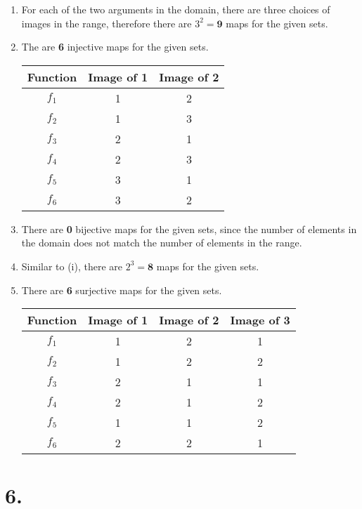 \documentclass[12pt]{article}
\newcommand{\p}[1]{\item[\textnormal{(#1)}]}
\newenvironment{ps}
{\begin{enumerate}[leftmargin=0em, itemindent=1.5em]}
{\end{enumerate}}
\begin{document}
\begin{ps}

    \p{i} For each of the two arguments in the domain, there are three choices of images in the
    range, therefore there are \( 3^2 = \mathbf{9} \) maps for the given sets.

    \p{ii} The are \textbf{6} injective maps for the given sets.
        \begin{center}
        \begin{tabular}{|c|c|c|}
        \hline
        Function & Image of 1 & Image of 2 \\
        \hline
        $f_1$ & 1 & 2 \\
        $f_2$ & 1 & 3 \\
        $f_3$ & 2 & 1 \\
        $f_4$ & 2 & 3 \\
        $f_5$ & 3 & 1 \\
        $f_6$ & 3 & 2 \\
        \hline
        \end{tabular}
        \end{center}

    \p{iii} There are \textbf{0} bijective maps for the given sets, since the number of elements in
    the domain does not match the number of elements in the range.

    \p{iv} Similar to (i), there are \( 2^3 = \textbf{8} \) maps for the given sets. 

    \p{v} There are \textbf{6} surjective maps for the given sets.

        \begin{center}
        \begin{tabular}{|c|c|c|c|}
        \hline
        Function & Image of 1 & Image of 2 & Image of 3 \\
        \hline
        $f_1$ & 1 & 2 & 1 \\
        $f_2$ & 1 & 2 & 2 \\
        $f_3$ & 2 & 1 & 1 \\
        $f_4$ & 2 & 1 & 2 \\
        $f_5$ & 1 & 1 & 2 \\
        $f_6$ & 2 & 2 & 1 \\
        \hline
        \end{tabular}
        \end{center}

\end{ps}

\section*{6.}
\end{document}
